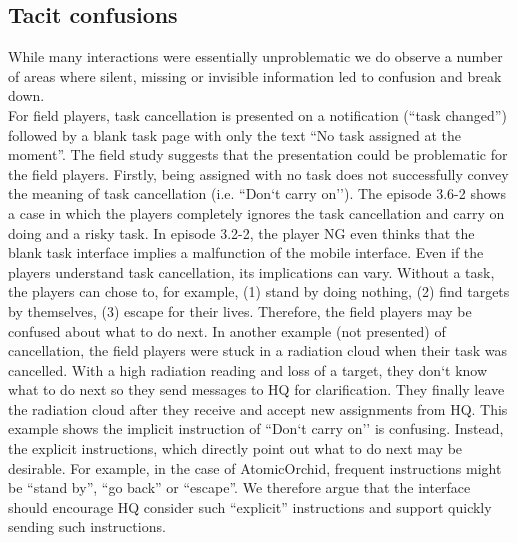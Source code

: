 \subsection{Tacit confusions}
While many interactions were essentially unproblematic we do observe a number of areas where silent, missing or invisible information led to confusion and break down.\\

For field players, task cancellation is presented on a notification (``task changed'') followed by a blank task page with only the text ``No task assigned at the moment''. The field study suggests that the presentation could be problematic for the field players. Firstly, being assigned with no task does not successfully convey the meaning of task cancellation (i.e. ``Don`t carry on''). The episode 3.6-2 shows a case in which the players completely ignores the task cancellation and carry on doing and a risky task. In episode 3.2-2, the player NG even thinks that the blank task interface implies a malfunction of the mobile interface. Even if the players understand task cancellation, its implications can vary. Without a task, the players can chose to, for example, (1) stand by doing nothing, (2) find targets by themselves, (3) escape for their lives. Therefore, the field players may be confused about what to do next. In another example (not presented) of cancellation, the field players were stuck in a radiation cloud when their task was cancelled. With a high radiation reading and loss of a target, they don`t know what to do next so they send messages to HQ for clarification. They finally leave the radiation cloud after they receive and accept new assignments from HQ. This example shows the implicit instruction of ``Don`t carry on'' is confusing. Instead, the explicit instructions, which directly point out what to do next may be desirable. For example, in the case of AtomicOrchid, frequent instructions might be ``stand by'', ``go back'' or ``escape''. We therefore argue that the interface should encourage HQ consider such ``explicit'' instructions and support quickly sending such instructions. \\

